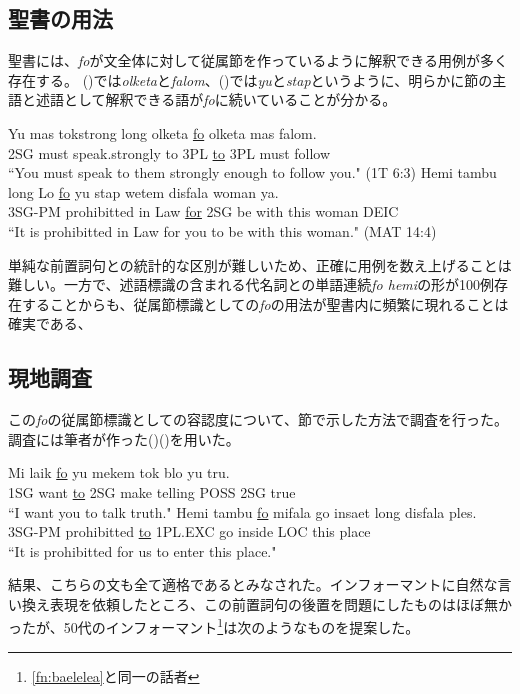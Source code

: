 \subsection{聖書の用法}
聖書には、\textit{fo}が文全体に対して従属節を作っているように解釈できる用例が多く存在する。
()では\textit{olketa}と\textit{falom}、()では\textit{yu}と\textit{stap}というように、明らかに節の主語と述語として解釈できる語が\textit{fo}に続いていることが分かる。

\begin{exe}
\ex\label{ex:purposefo}
\gll Yu mas tokstrong long olketa \underline{fo} olketa mas falom.\\
2SG must speak.strongly to 3PL \underline{to} 3PL must follow\\
\glt ``You must speak to them strongly enough to follow you." (1T 6:3)
\ex\label{ex:tambufo}
\gll Hemi tambu long Lo \underline{fo} yu stap wetem disfala woman ya.\\
3SG-PM prohibitted in Law \underline{for} 2SG be with this woman DEIC\\
\glt ``It is prohibitted in Law for you to be with this woman." (MAT 14:4)
\end{exe}

単純な前置詞句との統計的な区別が難しいため、正確に用例を数え上げることは難しい。一方で、述語標識の含まれる代名詞との単語連続\textit{fo hemi}の形が100例存在することからも、従属節標識としての\textit{fo}の用法が聖書内に頻繁に現れることは確実である、

\subsection{現地調査}
この\textit{fo}の従属節標識としての容認度について、\label{sec:howexamined}節で示した方法で調査を行った。調査には筆者が作った()()を用いた。

\begin{exe}
\ex\label{ex:laikfo}
\gll Mi laik \underline{fo} yu mekem tok blo yu tru.\\
1SG want \underline{to} 2SG make telling POSS 2SG true\\
\glt ``I want you to talk truth."
\ex
\gll Hemi tambu \underline{fo} mifala go insaet long disfala ples.\\
3SG-PM prohibitted \underline{to} 1PL.EXC go inside LOC this place\\
\glt ``It is prohibitted for us to enter this place."
\end{exe}

結果、こちらの文も全て適格であるとみなされた。インフォーマントに自然な言い換え表現を依頼したところ、この前置詞句の後置を問題にしたものはほぼ無かったが、50代のインフォーマント\footnote{\ref{fn:baelelea}と同一の話者}は次のようなものを提案した。

